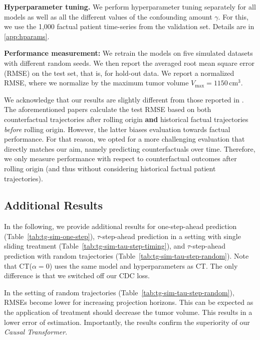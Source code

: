 \documentclass{article}
\theoremstyle{plain}
\theoremstyle{definition}
\theoremstyle{remark}
\newcommand{\longname}{\emph{Causal Transformer}\xspace}
\newcommand{\shortname}{CT\xspace}
\begin{document}
\textbf{Hyperparameter tuning.} We perform hyperparameter tuning separately for all models as well as all the different values of the confounding amount $\gamma$. For this, we use the 1,000 factual patient time-series from the validation set. Details are in \ref{app:hparams}.

\textbf{Performance measurement:} We retrain the models on five simulated datasets with different random seeds. We then report the averaged root mean square error (RMSE) on the test set, that is, for hold-out data. We report a normalized RMSE, where we normalize by the maximum tumor volume $V_{\text{max}} = 1150\,\text{cm}^3$. 

We acknowledge that our results are slightly different from those reported in \cite{lim2018forecasting,bica2020estimating}. The aforementioned papers calculate the test RMSE based on both counterfactual trajectories after rolling origin \textbf{and} historical factual trajectories \emph{before} rolling origin. However, the latter biases evaluation towards factual performance. For that reason, we opted for a more challenging evaluation that directly matches our aim, namely predicting counterfactuals over time. Therefore, we only measure performance with respect to counterfactual outcomes after rolling origin (and thus without considering historical factual patient trajectories). 

\subsection{Additional Results}

In the following, we provide additional results for one-step-ahead prediction (Table~\ref{tab:tg-sim-one-step}), $\tau$-step-ahead prediction in a setting with single sliding treatment (Table~\ref{tab:tg-sim-tau-step-timing}), and $\tau$-step-ahead prediction with random trajectories (Table~\ref{tab:tg-sim-tau-step-random}). Note that \shortname ($\alpha = 0$) uses the same model and hyperparameters as \shortname. The only difference is that we switched off our CDC loss. 

In the setting of random trajectories (Table~\ref{tab:tg-sim-tau-step-random}), RMSEs become lower for increasing projection horizons. This can be expected as the application of treatment should decrease the tumor volume. This results in a lower error of estimation. Importantly, the results confirm the superiority of our \longname.

\begin{table}[h!]
    \caption{Normalized RMSE for one-step-ahead prediction. Shown: mean and standard deviation over five runs (lower is better). Parameter $\gamma$ is the the amount of time-varying confounding: higher values mean larger treatment assignment bias.}
    \label{tab:tg-sim-one-step}
    \begin{center}
        \begin{small}
        
        \end{small}
    \end{center}
    \vskip -0.1in
\end{table}
\end{document}
